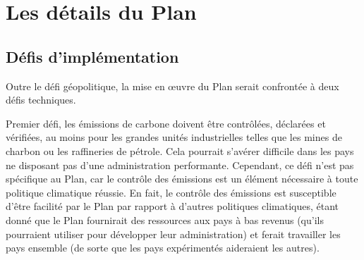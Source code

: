 \documentclass[a5paper,french]{memoir}
\begin{document}


\chapter{Les détails du Plan\label{ch:details}}

\section{Défis d'implémentation}
Outre le défi géopolitique, la mise en œuvre du Plan serait confrontée à deux défis techniques. 

Premier défi, les émissions de carbone doivent être contrôlées, déclarées et vérifiées, au moins pour les grandes unités industrielles telles que les mines de charbon ou les raffineries de pétrole. Cela pourrait s'avérer difficile dans les pays ne disposant pas d'une administration performante. Cependant, ce défi n'est pas spécifique au Plan, car le contrôle des émissions est un élément nécessaire à toute politique climatique réussie. En fait, le contrôle des émissions est susceptible d'être facilité par le Plan par rapport à d'autres politiques climatiques, étant donné que le Plan fournirait des ressources aux pays à bas revenus (qu'ils pourraient utiliser pour développer leur administration) et ferait travailler les pays ensemble (de sorte que les pays expérimentés aideraient les autres). 
\end{document}
